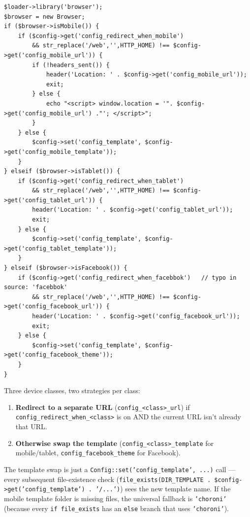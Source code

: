 \documentclass[11pt,a4paper]{article}
\begin{document}
\begin{lstlisting}[caption={The mobile template switching code in \texttt{app/shop/map.php}.},label={lst:mobile-switch}]
$loader->library('browser');
$browser = new Browser;
if ($browser->isMobile()) {
    if ($config->get('config_redirect_when_mobile')
        && str_replace('/web','',HTTP_HOME) !== $config->get('config_mobile_url')) {
        if (!headers_sent()) {
            header('Location: ' . $config->get('config_mobile_url'));
            exit;
        } else {
            echo "<script> window.location = '". $config->get('config_mobile_url') ."'; </script>";
        }
    } else {
        $config->set('config_template', $config->get('config_mobile_template'));
    }
} elseif ($browser->isTablet()) {
    if ($config->get('config_redirect_when_tablet')
        && str_replace('/web','',HTTP_HOME) !== $config->get('config_tablet_url')) {
        header('Location: ' . $config->get('config_tablet_url'));
        exit;
    } else {
        $config->set('config_template', $config->get('config_tablet_template'));
    }
} elseif ($browser->isFacebook()) {
    if ($config->get('config_redirect_when_facebbok')   // typo in source: 'facebbok'
        && str_replace('/web','',HTTP_HOME) !== $config->get('config_facebook_url')) {
        header('Location: ' . $config->get('config_facebook_url'));
        exit;
    } else {
        $config->set('config_template', $config->get('config_facebook_theme'));
    }
}
\end{lstlisting}

Three device classes, two strategies per class:
\begin{enumerate}[leftmargin=1.6em,itemsep=2pt]
  \item \textbf{Redirect to a separate URL} (\texttt{config\_<class>\_url})
        if \texttt{config\_redirect\_when\_<class>} is on AND the
        current URL isn't already that URL.
  \item \textbf{Otherwise swap the template} (\texttt{config\_<class>\_template}
        for mobile/tablet, \texttt{config\_facebook\_theme} for
        Facebook).
\end{enumerate}

The template swap is just a \texttt{Config::set('config\_template', ...)}
call --- every subsequent file-existence check
(\texttt{file\_exists(DIR\_TEMPLATE . \$config->get('config\_template') . '/...')})
sees the new template name. If the mobile template folder is
missing files, the universal fallback is \texttt{'choroni'} (because
every \texttt{if file\_exists} has an \texttt{else} branch that
uses \texttt{'choroni'}).
\end{document}
